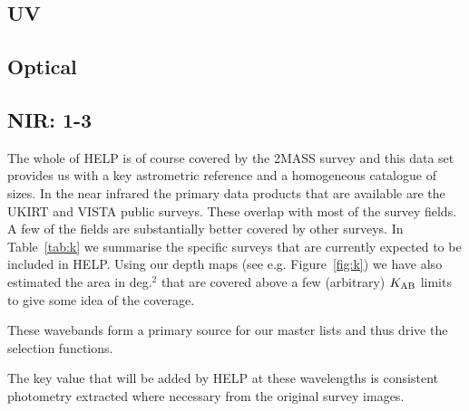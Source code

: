 \documentclass[usenatbib]{mnras}
\begin{document}
\subsection{UV}

\subsection{Optical}

\subsection{NIR: 1-3\micron}

The whole of HELP is of course covered by the 2MASS survey and this data set
provides us with a key astrometric reference and a homogeneous catalogue of
sizes.  In the  near infrared the primary data products that are available are
the UKIRT and VISTA public surveys.  These overlap with most of the survey
fields. A few of the fields are substantially better covered by other surveys.
In Table~\ref{tab:k} we summarise the specific surveys that are currently
expected to be included in HELP.  Using our depth maps (see e.g.
Figure~\ref{fig:k}) we have also estimated the area in deg.$^2$ that are covered
above a few (arbitrary) $K_{\rm AB}$ limits to give some idea of the coverage.

These wavebands form a primary source for our master lists and thus drive the
selection functions.

The key value that will be added by HELP at these wavelengths is consistent
photometry extracted where necessary from the original survey images.

%   



\end{document}
